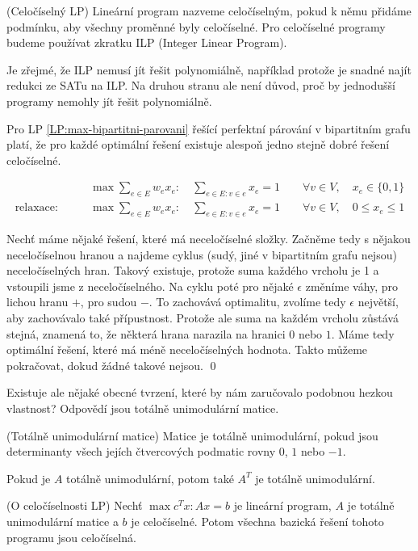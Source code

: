 \label{LP:celociselnost}
\df (Celočíselný LP) Lineární program nazveme celočíselným, pokud k němu přidáme
podmínku, aby všechny proměnné byly celočíselné. Pro celočíselné programy budeme
používat zkratku ILP (Integer Linear Program).

Je zřejmé, že ILP nemusí jít řešit polynomiálně, například protože je snadné
najít redukci ze SATu na ILP. Na druhou stranu ale není důvod, proč by jednodušší
programy nemohly jít řešit polynomiálně.

\tv Pro LP \eqref{LP:max-bipartitni-parovani} řešící perfektní párování v bipartitním grafu platí, že pro každé
optimální řešení existuje alespoň jedno stejně dobré řešení celočíselné.

\begin{align}
\label{LP:max-bipartitni-parovani}
&\max \sum_{e \in E} w_e x_e: \quad \sum_{e \in E: v \in e} x_e = 1 \qquad\forall v
	\in V, \quad x_e \in \{0, 1\} \\
	\text{relaxace:}\qquad	&\max \sum_{e \in E} w_e x_e: \quad \sum_{e \in E: v \in e} x_e = 1 \qquad\forall v
	\in V, \quad 0 \leq x_e \leq 1
\end{align}

\dk Nechť máme nějaké řešení, které má neceločíselné
složky. Začněme tedy s nějakou neceločíselnou hranou a najdeme cyklus (sudý,
jiné v bipartitním grafu nejsou) neceločíselných hran. Takový existuje, protože
suma každého vrcholu je 1 a vstoupili jsme z neceločíselného. Na cyklu poté pro
nějaké $\epsilon$ změníme váhy, pro lichou hranu $+$, pro sudou $-$. To
zachovává optimalitu, zvolíme tedy $\epsilon$ největší, aby zachovávalo také
přípustnost. Protože ale suma na každém vrcholu zůstává stejná, znamená to, že
některá hrana narazila na hranici $0$ nebo $1$. Máme tedy optimální řešení,
které má méně neceločíselných hodnota. Takto můžeme pokračovat, dokud žádné
takové nejsou. \qed

Existuje ale nějaké obecné tvrzení, které by nám zaručovalo podobnou hezkou
vlastnost? Odpovědí jsou totálně unimodulární matice.

\df (Totálně unimodulární matice) Matice je totálně unimodulární, pokud jsou
determinanty všech jejích čtvercových podmatic rovny $0$, $1$ nebo $-1$.

\poz Pokud je $A$ totálně unimodulární, potom také $A^T$ je totálně
unimodulární.

\vt (O celočíselnosti LP) Nechť $\max c^Tx : Ax = b$ je lineární program, $A$ je totálně
unimodulární matice a $b$ je celočíselné. Potom všechna bazická řešení tohoto
programu jsou celočíselná.

